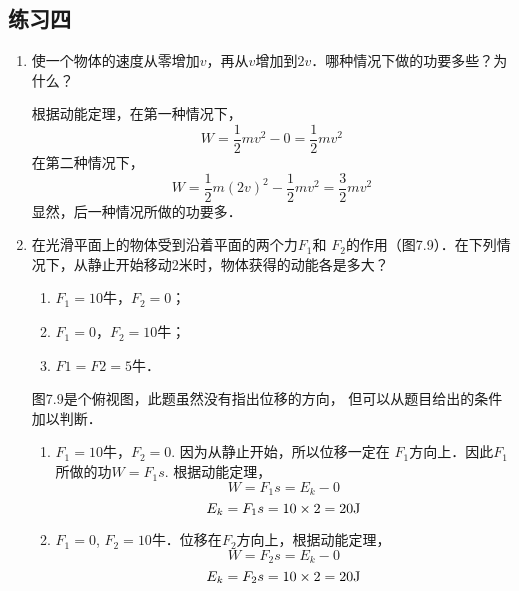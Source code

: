 \subsection{练习四}
\begin{enumerate}
    \item 使一个物体的速度从零增加$v$，再从$v$增加到$2v$．哪种情况下做的功要多些？为什么？

    \begin{solution}
    根据动能定理，在第一种情况下，
\[W=\frac{1}{2}mv^2-0=\frac{1}{2}mv^2\]
在第二种情况下，
\[W=\frac{1}{2}m(2v)^2-\frac{1}{2}mv^2=\frac{3}{2}mv^2\]
显然，后一种情况所做的功要多．
    \end{solution}
    \item 在光滑平面上的物体受到沿着平面的两个力$F_1$和
    $F_2$的作用（图7.9）．在下列情况下，从静止开始移动2米时，物体获得的动能各是多大？
    \begin{enumerate}
        \item $F_1=10$牛，$F_2=0$；
        \item $F_1=0$，$F_2=10$牛；
        \item $F1=F2=5$牛．
    \end{enumerate}


    \begin{solution}
图7.9是个俯视图，此题虽然没有指出位移的方向，
但可以从题目给出的条件加以判断．
\begin{enumerate}
    \item $F_1=10$牛，$F_2=0$. 因为从静止开始，所以位移一定在
    $F_1$方向上．因此$F_1$所做的功$W=F_1s$. 根据动能定理，
    \[W=F_1s=E_k-0\]
   \[ E_k=F_1s=10\times2=20{\rm J}\]
    \item $F_1=0$, $F_2=10$牛．位移在$F_2$方向上，根据动能定理，
\[    W=F_2s=E_k-0\]
\[    E_k=F_2s=10\times2=20{\rm J}\]


\end{enumerate}
\end{solution}
\end{enumerate}
